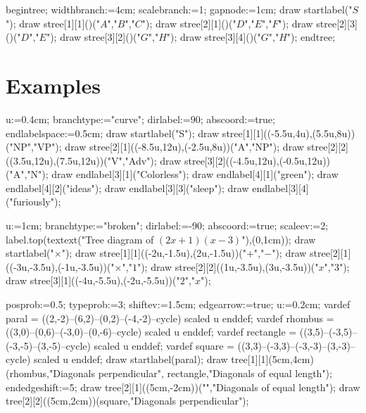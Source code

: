 \documentclass[11pt,a4paper,english]{article}
\begin{document}
\begin{exemple}
begintree;
widthbranch:=4cm;
scalebranch:=1;
gapnode:=1cm;
draw startlabel("$S$");
draw stree[1][1]()("$A$","$B$","$C$");
draw stree[2][1]()("$D$","$E$","$F$");
draw stree[2][3]()("$D$","$E$");
draw stree[3][2]()("$G$","$H$");
draw stree[3][4]()("$G$","$H$");
endtree;
\end{exemple}

\section{Examples}

\begin{exemple}
u:=0.4cm;
branchtype:="curve";
dirlabel:=90;
abscoord:=true;
endlabelspace:=0.5cm;
draw startlabel("S");
draw stree[1][1]((-5.5u,4u),(5.5u,8u))("NP","VP");
draw stree[2][1]((-8.5u,12u),(-2.5u,8u))("A","NP");
draw stree[2][2]((3.5u,12u),(7.5u,12u))("V","Adv");
draw stree[3][2]((-4.5u,12u),(-0.5u,12u))("A","N");
draw endlabel[3][1]("Colorless");
draw endlabel[4][1]("green");
draw endlabel[4][2]("ideas");
draw endlabel[3][3]("sleep");
draw endlabel[3][4]("furiously");
\end{exemple}



\begin{exemple}
u:=1cm;
branchtype:="broken";
dirlabel:=-90;
abscoord:=true;
scaleev:=2;
label.top(textext("\Large Tree diagram of $(2x+1)(x-3)$"),(0,1cm));
draw startlabel("$\times$");
draw stree[1][1]((-2u,-1.5u),(2u,-1.5u))("$+$","$-$");
draw stree[2][1]((-3u,-3.5u),(-1u,-3.5u))("$\times$","$1$");
draw stree[2][2]((1u,-3.5u),(3u,-3.5u))("$x$","$3$");
draw stree[3][1]((-4u,-5.5u),(-2u,-5.5u))("$2$","$x$");
\end{exemple}


\begin{exemple}
posprob:=0.5;
typeprob:=3;
shiftev:=1.5cm;
edgearrow:=true;
u:=0.2cm;
vardef paral = ((2,-2)--(6,2)--(0,2)--(-4,-2)--cycle) scaled u enddef;
vardef rhombus = ((3,0)--(0,6)--(-3,0)--(0,-6)--cycle) scaled u enddef;
vardef rectangle = ((3,5)--(-3,5)--(-3,-5)--(3,-5)--cycle) scaled u enddef;
vardef square = ((3,3)--(-3,3)--(-3,-3)--(3,-3)--cycle) scaled u enddef;
draw startlabel(paral);
draw tree[1][1](5cm,4cm)(rhombus,"Diagonals perpendicular",%
                            rectangle,"Diagonals of equal length");
endedgeshift:=5;
draw tree[2][1]((5cm,-2cm))("","Diagonals of equal length");
draw tree[2][2]((5cm,2cm))(square,"Diagonals perpendicular");
\end{exemple}
\end{document}
